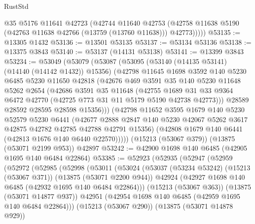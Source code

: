 \begin{lexlean}{RustStd}
\begin{coremodule}
          @35
          @5176
          @11641
          @42723
          (@42744
            @11640
            @42753
            (@42758 @11638 @5190 (@42763 @11638 @42766 (@13759 (@13760 @11638))) @42773)))))
@53135 := @13305 @1432
@53136 := @13501 @53135
@53137 := @53134 @53136
@53138 := @13375 @3843
@53140 := @53137 (@14131 @53138)
@53141 := @13399 @3843
@53234 := @53049
    (@53079
      (@53087
        (@53095
          (@53140 (@14135 @53141) (@14140 (@14142 @1432)) @15356)
          (@42798
            @11645
            @1698
            @3592
            @140
            @5230
            @6485
            @5230
            @11650
            @42818
            (@42676
              @469
              @3591
              @35
              @140
              @5230
              @11648
              @5262
              @2654
              (@42686
                @3591
                @35
                @11648
                (@42755
                  @1689
                  @31
                  @33
                  @9364
                  @6472
                  @42770
                  (@42725 @773 @31 @11 @5179 @5190 @42738 @42773)))
              @28589
              @28592
              @28595
              @28598
              @15356)))
        (@42798
          @11652
          @3595
          @1679
          @140
          @5230
          @52579
          @5230
          @6441
          (@42677
            @2888
            @2847
            @140
            @5230
            @42067
            @5262
            @3617
            @42875
            @42782
            @42785
            @42788
            @42791
            @15356)
          (@42808 @1679 @140 @6441 (@42813 @1676 @140 @6440 @22570)))))
    (@15213 (@53067 @379))
    (@13875 (@53071 @2199 @953))
    @42897
@53242 := @42900 @1698 @140 @6485 (@42905 @1695 @140 @6484 @22864)
@53385 := @52923
    (@52935
      (@52947
        (@52959
          (@52972
            (@52985
              (@52998
                (@53011
                  (@53024
                    (@53037
                      (@53234 @53242)
                      (@15213 (@53067 @371))
                      (@13875 (@53071 @2200 @944))
                      @42924
                      (@42927 @1698 @140 @6485 (@42932 @1695 @140 @6484 @22864)))
                    (@15213 (@53067 @363))
                    (@13875 (@53071 @14877 @937))
                    @42951
                    (@42954 @1698 @140 @6485 (@42959 @1695 @140 @6484 @22864)))
                  (@15213 (@53067 @290))
                  (@13875 (@53071 @14878 @929))

\end{coremodule}
\end{lexlean}
